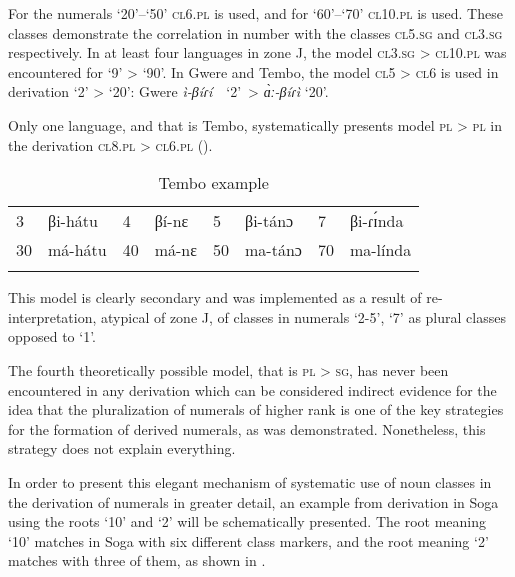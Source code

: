 For the numerals ‘20’–‘50’ \textsc{cl}6.\textsc{pl} is used, and for ‘60’–‘70’ \textsc{cl}10.\textsc{pl} is used. These classes demonstrate the correlation in number with the classes \textsc{cl}5.\textsc{sg} and \textsc{cl}3.\textsc{sg} respectively. In at least four languages in zone J, the model \textsc{cl}3.\textsc{sg} > \textsc{cl}10.\textsc{pl} was encountered for ‘9’ > ‘90’. In Gwere and Tembo, the model \textsc{cl}5 > \textsc{cl}6 is used in derivation ‘2’ > ‘20’: Gwere \textit{ì-β}\textit{íɾí}~~‘2’~>  \textit{{\`{ɑ}}ː-β}\textit{íɾì} ‘20’. 

Only one language, and that is Tembo, systematically presents model \textsc{pl} > \textsc{pl} in the derivation \textsc{cl}8.\textsc{pl}  > \textsc{cl}6.\textsc{pl} ().


\begin{table}
\caption{\label{tab:1:24} Tembo example}

\begin{tabularx}{\textwidth}{lX lX lX lX}
\lsptoprule

3 &  βi-hátu & 4 &  βí-nɛ & 5 &  βi-tánɔ & 7 &  βi-ɾ{\'{ɪ}}nda\\
30 & má-hátu & 40 & má-nɛ & 50 & ma-tánɔ & 70 & ma-línda\\
\lspbottomrule
\end{tabularx}
\end{table}


This model is clearly secondary and was implemented as a result of re-interpretation, atypical of zone J, of classes in numerals ‘2-5’, ‘7’ as plural classes opposed to ‘1’. 

The fourth theoretically possible model, that is \textsc{pl} > \textsc{sg}, has never been encountered in any derivation which can be considered indirect evidence for the idea that the pluralization of numerals of higher rank is one of the key strategies for the formation of derived numerals, as was demonstrated. Nonetheless, this strategy does not explain everything. 

In order to present this elegant mechanism of systematic use of noun classes in the derivation of numerals in greater detail, an example from derivation in Soga using the roots `10' and `2' will be schematically presented. The root meaning `10' matches in Soga with six different class markers, and the root meaning ‘2’ matches with three of them, as shown in . 
 







